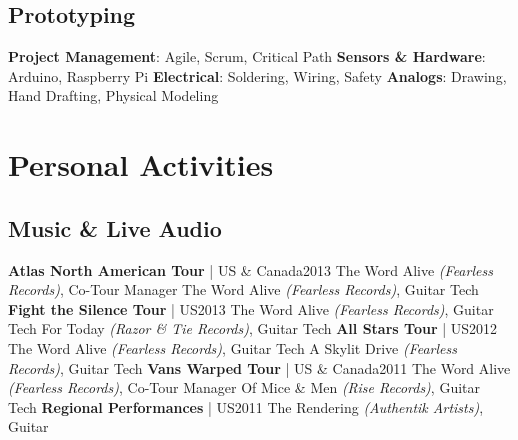 \documentclass{article}
\begin{document}
    \subsection*{Prototyping}
        \textbf{Project Management}: Agile, Scrum, Critical Path\newline
        \textbf{Sensors \& Hardware}: Arduino, Raspberry Pi\newline
        \textbf{Electrical}: Soldering, Wiring, Safety\newline
        \textbf{Analogs}: Drawing, Hand Drafting, Physical Modeling
    \section*{Personal Activities}
    \subsection*{Music \& Live Audio}
        \textbf{Atlas North American Tour} | US \& Canada\hfill{2013}\newline
        The Word Alive \textit{(Fearless Records)}, Co-Tour Manager\newline
        The Word Alive \textit{(Fearless Records)}, Guitar Tech\newline\newline
        \textbf{Fight the Silence Tour} | US\hfill{2013}\newline
        The Word Alive \textit{(Fearless Records)}, Guitar Tech\newline
        For Today \textit{(Razor \& Tie Records)}, Guitar Tech\newline\newline
        \textbf{All Stars Tour} | US\hfill{2012}\newline
        The Word Alive \textit{(Fearless Records)}, Guitar Tech\newline
        A Skylit Drive \textit{(Fearless Records)}, Guitar Tech\newline\newline
        \textbf{Vans Warped Tour} | US \& Canada\hfill{2011}\newline
        The Word Alive \textit{(Fearless Records)}, Co-Tour Manager\newline
        Of Mice \& Men \textit{(Rise Records)}, Guitar Tech\newline\newline
        \textbf{Regional Performances} | US\hfill{2011}\newline
        The Rendering \textit{(Authentik Artists)}, Guitar
\end{document}
